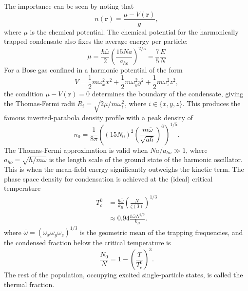 	The importance can be seen by noting that 
	\begin{equation}
		n(\textbf{r}) = \frac{\mu-V(\textbf{r})}{g},
	\end{equation}
	where $\mu$ is the chemical potential.
	The chemical potential for the harmonically trapped condensate also fixes the average energy per particle:
	\begin{equation}
		\mu = \frac{\hbar\bar{\omega}}{2}\left(\frac{15 N a}{a_{ho}}\right)^{2/5} = \frac{7}{5}\frac{E}{N}
	\end{equation}
	For a Bose gas confined in a harmonic potential of the form
	\begin{equation}
		V = \frac{1}{2} m \omega_x^2 x^2 + \frac{1}{2} m \omega_y^2 y^2 + \frac{1}{2} m \omega_z^2 z^2,
	\end{equation}
	the condition $\mu-V(\textbf{r})=0$ determines the boundary of the condensate, giving the Thomas-Fermi radii $R_i = \sqrt{2\mu/m \omega_i^2}$, where $i\in\{x,y,z\}$.
	This produces the famous inverted-parabola density profile with a peak density of
	\begin{equation}
		n_0 = \frac{1}{8 \pi}\left( (15N_0)^2 \left(\frac{m \bar{\omega}}{\sqrt{a \hbar}}\right)^{6}\right)^{1/5}.
		\label{eqn:n0}
	\end{equation}
	The Thomas-Fermi approximation is valid when $N a/a_{ho}\gg1$, where $a_{ho} = \sqrt{\hbar/m\omega}$ is the length scale of the ground state of the harmonic oscillator.
	This is when the mean-field energy significantly outweighs the kinetic term.
	The phase space density for condensation is achieved at the (ideal) critical temperature 
	\begin{align}
		T_c^{0} &= \frac{\hbar \bar{\omega}}{k_B}\left(\frac{N}{\zeta(3)}\right)^{1/3}\\
				&\approx0.94\frac{\hbar \bar{\omega} N^{1/3}}{k_B}.
	\end{align}
	where $\bar{\omega}=(\omega_x\omega_y\omega_z)^{1/3}$ is the geometric mean of the trapping frequencies, and the condensed fraction below the critical temperature is 
	\begin{equation}
		\frac{N_0}{N} = 1 - \left(\frac{T}{T_c^{0}}\right)^3.
	\end{equation}
	The rest of the population, occupying excited single-particle states, is called the thermal fraction.
